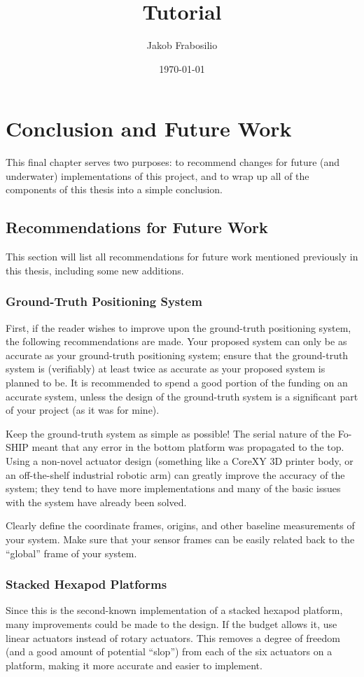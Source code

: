 \documentclass[12pt,a4paper]{report}
\title{Tutorial}
\author{Jakob Frabosilio}
\date{\today}
\begin{document}
\chapter{Conclusion and Future Work} \label{chap:7c}
This final chapter serves two purposes: to recommend changes for future (and underwater) implementations of this project, and to wrap up all of the components of this thesis into a simple conclusion.

\section{Recommendations for Future Work} \label{sec:7s1}
This section will list all recommendations for future work mentioned previously in this thesis, including some new additions.

\subsection{Ground-Truth Positioning System} \label{sec:7s1s1}
First, if the reader wishes to improve upon the ground-truth positioning system, the following recommendations are made. Your proposed system can only be as accurate as your ground-truth positioning system; ensure that the ground-truth system is (verifiably) at least twice as accurate as your proposed system is planned to be. It is recommended to spend a good portion of the funding on an accurate system, unless the design of the ground-truth system is a significant part of your project (as it was for mine). 

Keep the ground-truth system as simple as possible! The serial nature of the Fo-SHIP meant that any error in the bottom platform was propagated to the top. Using a non-novel actuator design (something like a CoreXY 3D printer body, or an off-the-shelf industrial robotic arm) can greatly improve the accuracy of the system; they tend to have more implementations and many of the basic issues with the system have already been solved.

Clearly define the coordinate frames, origins, and other baseline measurements of your system. Make sure that your sensor frames can be easily related back to the “global” frame of your system.

\subsection{Stacked Hexapod Platforms} \label{sec:7s1s3}
Since this is the second-known implementation of a stacked hexapod platform, many improvements could be made to the design. If the budget allows it, use linear actuators instead of rotary actuators. This removes a degree of freedom (and a good amount of potential “slop”) from each of the six actuators on a platform, making it more accurate and easier to implement.
\end{document}
